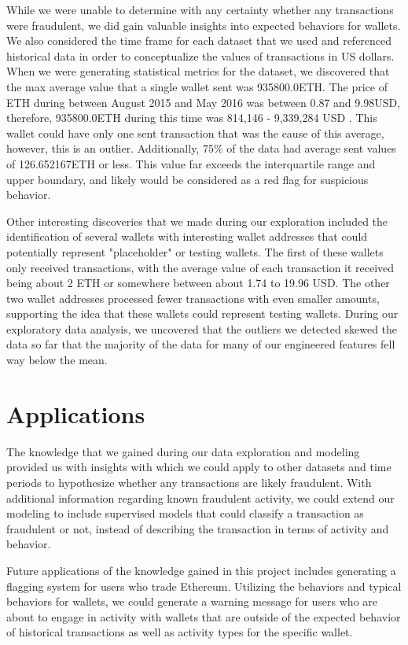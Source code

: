 \documentclass[sigconf]{acmart}
\begin{document}
While we were unable to determine with any certainty whether any transactions were fraudulent, we did gain valuable insights into expected behaviors for wallets. We also considered the time frame for each dataset that we used and referenced historical data in order to conceptualize the values of transactions in US dollars. When we were generating statistical metrics for the dataset, we discovered that the max average value that a single wallet sent was 935800.0ETH. The price of ETH during between August 2015 and May 2016 was between 0.87 and 9.98USD, therefore, 935800.0ETH during this time was 814,146 - 9,339,284 USD \cite{EthHistorical}. This wallet could have only one sent transaction that was the cause of this average, however, this is an outlier. Additionally, 75\% of the data had average sent values of 126.652167ETH or less. This value far exceeds the interquartile range and upper boundary, and likely would be considered as a red flag for suspicious behavior.  

Other interesting discoveries that we made during our exploration included the identification of several wallets with interesting wallet addresses that could potentially represent "placeholder" or testing wallets. The first of these wallets only received transactions, with the average value of each transaction it received being about 2 ETH or somewhere between about 1.74 to 19.96 USD. The other two wallet addresses processed fewer transactions with even smaller amounts, supporting the idea that these wallets could represent testing wallets. During our exploratory data analysis, we uncovered that the outliers we detected skewed the data so far that the majority of the data for many of our engineered features fell way below the mean. 


\section{Applications}
The knowledge that we gained during our data exploration and modeling provided us with insights with which we could apply to other datasets and time periods to hypothesize whether any transactions are likely fraudulent. With additional information regarding known fraudulent activity, we could extend our modeling to include supervised models that could classify a transaction as fraudulent or not, instead of describing the transaction in terms of activity and behavior. 

Future applications of the knowledge gained in this project includes generating a flagging system for users who trade Ethereum. Utilizing the behaviors and typical behaviors for wallets, we could generate a warning message for users who are about to engage in activity with wallets that are outside of the expected behavior of historical transactions as well as activity types for the specific wallet. 





 
\end{document}
